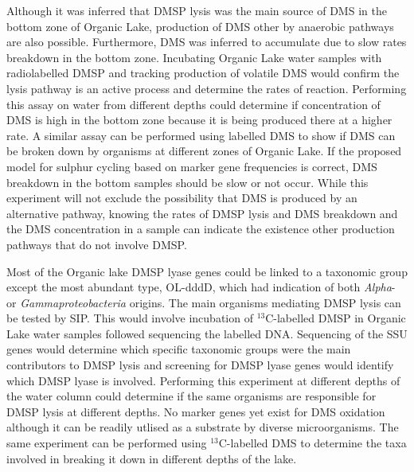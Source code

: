 Although it was inferred that \ac{DMSP} lysis was the main source of \ac{DMS} in the bottom zone of Organic Lake, production of \ac{DMS} other by anaerobic pathways are also possible.
Furthermore, \ac{DMS} was inferred to accumulate due to slow rates breakdown in the bottom zone.
Incubating Organic Lake water samples with radiolabelled \ac{DMSP} and tracking production of volatile \ac{DMS} would confirm the lysis pathway is an active process and determine the rates of reaction.
Performing this assay on water from different depths could determine if concentration of \ac{DMS} is high in the bottom zone because it is being produced there at a higher rate.
A similar assay can be performed using labelled \ac{DMS} to show if \ac{DMS} can be broken down by organisms at different zones of Organic Lake.
If the proposed model for sulphur cycling based on marker gene frequencies is correct, \ac{DMS} breakdown in the bottom samples should be slow or not occur.
While this experiment will not exclude the possibility that \ac{DMS} is produced by an alternative pathway, knowing the rates of \ac{DMSP} lysis and \ac{DMS} breakdown and the \ac{DMS} concentration in a sample can indicate the existence other production pathways that do not involve \ac{DMSP}.

Most of the Organic lake \ac{DMSP} lyase genes could be linked to a taxonomic group except the most abundant type, OL-dddD, which had indication of both \emph{Alpha}- or \emph{Gammaproteobacteria} origins.
The main organisms mediating \ac{DMSP} lysis can be tested by \ac{SIP}.
This would involve incubation of $^{13}$C-labelled \ac{DMSP} in Organic Lake water samples followed sequencing the labelled DNA.
Sequencing of the \ac{SSU} genes would determine which specific taxonomic groups were the main contributors to \ac{DMSP} lysis and screening for \ac{DMSP} lyase genes would identify which \ac{DMSP} lyase is involved.
Performing this experiment at different depths of the water column could determine if the same organisms are responsible for \ac{DMSP} lysis at different depths.
No marker genes yet exist for \ac{DMS} oxidation although it can be readily utlised as a substrate by diverse microorganisms.
The same experiment can be performed using $^{13}$C-labelled \ac{DMS} to determine the taxa involved in breaking it down in different depths of the lake.



